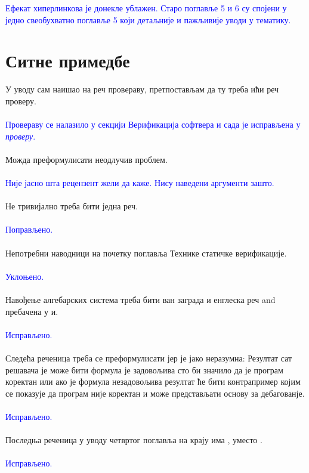 \documentclass[a4paper]{report}
\newcommand{\odgovor}[1]{\textcolor{blue}{#1}}
\begin{document}
\odgovor{Ефекат хиперлинкова је донекле ублажен. Старо поглавље 5 и 6 су спојени у једно свеобухватно поглавље 5 који детаљније и пажљивије уводи у тематику.}

\section{Ситне примедбе}
У уводу сам наишао на реч провераву, претпостављам да ту треба ићи реч проверу.
    \\\\
    \odgovor{Провераву се налазило у секцији Верификација софтвера и сада је исправљена у \emph{проверу}.} 
	\\\\
Можда преформулисати неодлучив проблем.
    \\\\
    \odgovor{Није јасно шта рецензент жели да каже. Нису наведени аргументи зашто.} 
	\\\\
Не тривијално треба бити једна реч.
    \\\\
    \odgovor{Поправљено.} 
	\\\\
Непотребни наводници на почетку поглавља Технике статичке верификације.
    \\\\
    \odgovor{Уклоњено.} 
	\\\\
Навођење алгебарских система треба бити ван заграда и енглеска реч and пребачена у и.
    \\\\
    \odgovor{Исправљено.} 
	\\\\
Следећа реченица треба се преформулисати јер је јако неразумна: Резултат сат решавача је може бити формула је задовољива сто би значило да је програм коректан или ако је формула незадовољива резултат ће бити контрапример којим се показује да програм није коректан и може представљати основу за дебагованје. 
    \\\\
    \odgovor{Исправљено.} 
	\\\\
Последња реченица у уводу четвртог поглавља на крају има , уместо .
    \\\\
    \odgovor{Исправљено.} 
	\\\\
\end{document}

